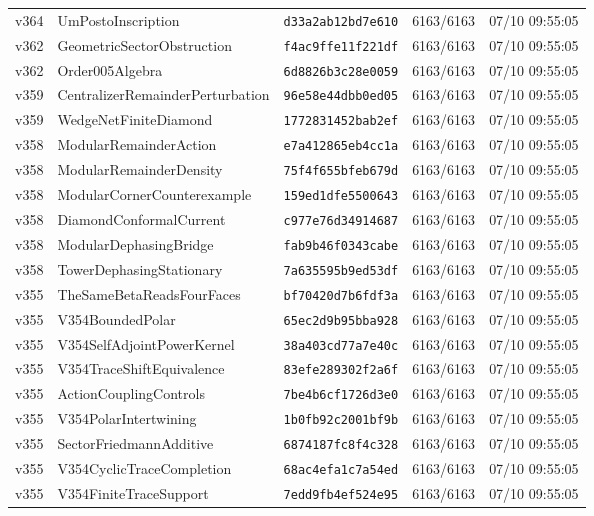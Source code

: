 \documentclass[11pt]{article}
\theoremstyle{definition}\newtheorem{deriv}{Derivação}
\begin{document}
{\begin{longtable}{@{}lllll@{}}
v364 & UmPostoInscription & \texttt{d33a2ab12bd7e610} & 6163/6163 & 07/10 09:55:05 \\
v362 & GeometricSectorObstruction & \texttt{f4ac9ffe11f221df} & 6163/6163 & 07/10 09:55:05 \\
v362 & Order005Algebra & \texttt{6d8826b3c28e0059} & 6163/6163 & 07/10 09:55:05 \\
v359 & CentralizerRemainderPerturbation & \texttt{96e58e44dbb0ed05} & 6163/6163 & 07/10 09:55:05 \\
v359 & WedgeNetFiniteDiamond & \texttt{1772831452bab2ef} & 6163/6163 & 07/10 09:55:05 \\
v358 & ModularRemainderAction & \texttt{e7a412865eb4cc1a} & 6163/6163 & 07/10 09:55:05 \\
v358 & ModularRemainderDensity & \texttt{75f4f655bfeb679d} & 6163/6163 & 07/10 09:55:05 \\
v358 & ModularCornerCounterexample & \texttt{159ed1dfe5500643} & 6163/6163 & 07/10 09:55:05 \\
v358 & DiamondConformalCurrent & \texttt{c977e76d34914687} & 6163/6163 & 07/10 09:55:05 \\
v358 & ModularDephasingBridge & \texttt{fab9b46f0343cabe} & 6163/6163 & 07/10 09:55:05 \\
v358 & TowerDephasingStationary & \texttt{7a635595b9ed53df} & 6163/6163 & 07/10 09:55:05 \\
v355 & TheSameBetaReadsFourFaces & \texttt{bf70420d7b6fdf3a} & 6163/6163 & 07/10 09:55:05 \\
v355 & V354BoundedPolar & \texttt{65ec2d9b95bba928} & 6163/6163 & 07/10 09:55:05 \\
v355 & V354SelfAdjointPowerKernel & \texttt{38a403cd77a7e40c} & 6163/6163 & 07/10 09:55:05 \\
v355 & V354TraceShiftEquivalence & \texttt{83efe289302f2a6f} & 6163/6163 & 07/10 09:55:05 \\
v355 & ActionCouplingControls & \texttt{7be4b6cf1726d3e0} & 6163/6163 & 07/10 09:55:05 \\
v355 & V354PolarIntertwining & \texttt{1b0fb92c2001bf9b} & 6163/6163 & 07/10 09:55:05 \\
v355 & SectorFriedmannAdditive & \texttt{6874187fc8f4c328} & 6163/6163 & 07/10 09:55:05 \\
v355 & V354CyclicTraceCompletion & \texttt{68ac4efa1c7a54ed} & 6163/6163 & 07/10 09:55:05 \\
v355 & V354FiniteTraceSupport & \texttt{7edd9fb4ef524e95} & 6163/6163 & 07/10 09:55:05 \\

\end{longtable}}
\end{document}
